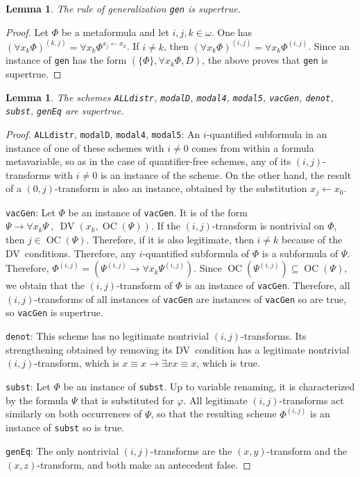 \documentclass[11pt]{article}
\newcommand*{\comma}{\:,\:}
\renewcommand*{\phi}{\varphi}
\DeclareMathOperator{\DV}{DV}
\DeclareMathOperator{\OC}{OC}
\theoremstyle{plain}
\newtheorem{lemma}[theorem]{Lemma}
\theoremstyle{definition}
\theoremstyle{remark}
\begin{document}
\begin{lemma}
The rule of generalization \texttt{gen} is supertrue.
\end{lemma}

\begin{proof}
Let $\Phi$ be a metaformula and let $i, j, k \in \omega$.
One has $(\forall x_k \Phi)^{(k, j)} = \forall x_k \Phi^{x_j \leftarrow x_k}$.
If $i \neq k$, then $(\forall x_k \Phi)^{(i, j)} = \forall x_k \Phi^{(i, j)}$.
Since an instance of \texttt{gen} has the form $(\{\Phi\}, \forall x_k \Phi, D)$, the above proves that \texttt{gen} is supertrue.
\end{proof}

\begin{lemma}
The schemes \texttt{ALLdistr}, \texttt{modalD}, \texttt{modal4}, \texttt{modal5}, \texttt{vacGen}, \texttt{denot}, \texttt{subst}, \texttt{genEq} are supertrue.
\end{lemma}

\begin{proof}
\texttt{ALLdistr}, \texttt{modalD}, \texttt{modal4}, \texttt{modal5}:
An $i$-quantified subformula in an instance of one of these schemes with $i \neq 0$ comes from within a formula metavariable, so as in the case of quantifier-free schemes, any of its $(i, j)$-transforms with $i \neq 0$ is an instance of the scheme.
On the other hand, the result of a $(0, j)$-transform is also an instance, obtained by the substitution $x_j \leftarrow x_0$.

\texttt{vacGen}:
Let $\Phi$ be an instance of \texttt{vacGen}.
It is of the form $\Psi \to \forall x_k \Psi \comma \DV(x_k, \OC(\Psi))$.
If the $(i, j)$-transform is nontrivial on $\Phi$, then $j \in \OC(\Psi)$.
Therefore, if it is also legitimate, then $i \neq k$ because of the DV~conditions.
Therefore, any $i$-quantified subformula of $\Phi$ is a subformula of $\Psi$.
Therefore, $\Phi^{(i, j)} = (\Psi^{(i, j)} \to \forall x_k \Psi^{(i, j)})$.
Since $\OC(\Psi^{(i, j)}) \subseteq \OC(\Psi)$, we obtain that the $(i, j)$-transform of $\Phi$ is an instance of \texttt{vacGen}.
Therefore, all $(i, j)$-transforms of all instances of \texttt{vacGen} are instances of \texttt{vacGen} so are true, so \texttt{vacGen} is supertrue.

\texttt{denot}:
This scheme has no legitimate nontrivial $(i, j)$-transforms.
Its strengthening obtained by removing its DV~condition has a legitimate nontrivial
$(i, j)$-transform, which is $x \equiv x \to \exists x x \equiv x$, which is true.

\texttt{subst}:
Let $\Phi$ be an instance of \texttt{subst}.
Up to variable renaming, it is characterized by the formula $\Psi$ that is substituted for $\phi$.
All legitimate $(i, j)$-transforms act similarly on both occurrences of $\Psi$, so that the
resulting scheme $\Phi^{(i, j)}$ is an instance of \texttt{subst} so is true.

\texttt{genEq}:
The only nontrivial $(i, j)$-transforms are the $(x, y)$-transform and the $(x, z)$-transform, and
both make an antecedent false.
\end{proof}
\end{document}
